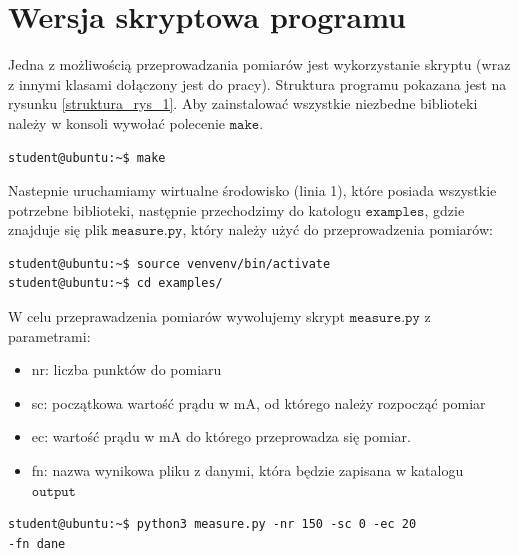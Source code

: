 \section{Wersja skryptowa programu}
Jedna z możliwością przeprowadzania pomiarów jest wykorzystanie skryptu (wraz z innymi klasami dołączony jest do pracy).
Struktura programu pokazana jest na rysunku \ref{struktura_rys_1}. Aby zainstalować wszystkie niezbedne biblioteki należy
w konsoli wywołać polecenie $\mathtt{make}$.
\begin{lstlisting}[style=Bash]
student@ubuntu:~$ make
\end{lstlisting}
Nastepnie uruchamiamy wirtualne środowisko (linia 1), które posiada wszystkie potrzebne biblioteki, następnie
przechodzimy do katologu $\mathtt{examples}$, gdzie znajduje się plik $\mathtt{measure.py}$, który należy użyć do
przeprowadzenia pomiarów:
\begin{lstlisting}[style=Bash]
student@ubuntu:~$ source venvenv/bin/activate
student@ubuntu:~$ cd examples/
\end{lstlisting}
W celu przeprawadzenia pomiarów wywolujemy skrypt $\mathtt{measure.py}$ z parametrami:
\begin{itemize}
\item nr: liczba punktów do pomiaru
\item sc: początkowa wartość prądu w mA, od którego należy rozpocząć pomiar
\item ec: wartość prądu w mA do którego przeprowadza się pomiar.
\item fn: nazwa wynikowa pliku z danymi, która będzie zapisana w katalogu $\mathtt{output}$
\end{itemize}
\begin{lstlisting}[style=Bash]
student@ubuntu:~$ python3 measure.py -nr 150 -sc 0 -ec 20
-fn dane
\end{lstlisting}

